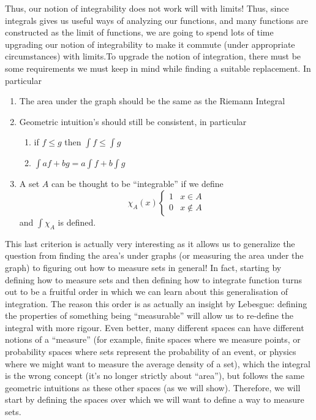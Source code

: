 \documentclass[oneside]{book}
\begin{document}
Thus, our notion of integrability does not work will with limits! Thus, since integrals gives us useful ways of
analyzing our functions, and many functions are constructed as the limit of functions, we are going to spend lots of
time upgrading our notion of integrability to make it commute (under appropriate circumstances) with limits.To upgrade the notion of integration, there must be some
requirements we must keep in mind while finding a suitable replacement. In particular
\begin{enumerate}
	\item The area under the graph should be the same as the Riemann Integral
	\item Geometric intuition's should still be consistent, in particular
		\begin{enumerate}
			\item  if $f \le g$ then $\int f \le \int g$
			\item $\int af + bg = a\int f + b\int g$
		\end{enumerate}
	\item A set $A$ can be thought to be ``integrable'' if we define
		\[
			\chi_A(x) \begin{cases}
				1 & x \in A\\
				0 & x \notin A
			\end{cases}
		\]
		and $\int \chi_A$ is defined. 
\end{enumerate}

This last criterion is actually very interesting as it allows us to generalize the question from finding the area's
under graphs (or measuring the area under the graph) to figuring out how to measure sets in general! In fact, starting
by defining how to measure sets and then defining how to integrate function turns out to be a fruitful order in which we
can learn about this generalisation of integration. The reason this order is as actually an insight by Lebesgue:
defining the properties of something being ``measurable'' will allow us to re-define the integral with more rigour. Even
better, many different spaces can have different notions of a ``measure'' (for example, finite spaces where we measure
points, or probability spaces where sets represent the probability of an event, or physics where we might want to
measure the average density of a set), which the integral is the wrong concept (it's no longer strictly about ``area''),
but follows the same geometric intuitions as these other spaces (as we will show). Therefore, we will start by defining
the spaces over which we will want to define a way to measure sets. 
\end{document}
